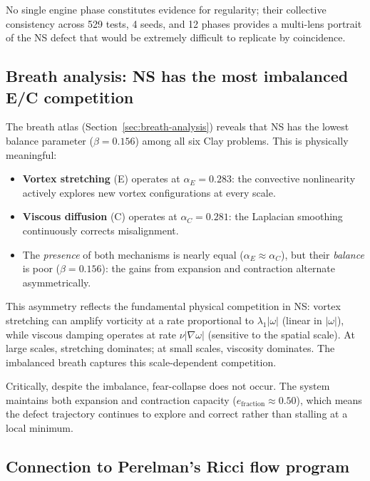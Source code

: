 \documentclass[11pt]{article}
\theoremstyle{definition}
\theoremstyle{remark}
\begin{document}
No single engine phase constitutes evidence for regularity; their collective
consistency across 529 tests, 4 seeds, and 12 phases provides a multi-lens
portrait of the NS defect that would be extremely difficult to replicate
by coincidence.

\subsection{Breath analysis: NS has the most imbalanced E/C competition}

The breath atlas (Section~\ref{sec:breath-analysis}) reveals that NS has
the lowest balance parameter ($\beta = 0.156$) among all six Clay problems.
This is physically meaningful:

\begin{itemize}[nosep]
  \item \textbf{Vortex stretching} (E) operates at $\alpha_E = 0.283$:
    the convective nonlinearity actively explores new vortex configurations
    at every scale.
  \item \textbf{Viscous diffusion} (C) operates at $\alpha_C = 0.281$:
    the Laplacian smoothing continuously corrects misalignment.
  \item The \emph{presence} of both mechanisms is nearly equal ($\alpha_E
    \approx \alpha_C$), but their \emph{balance} is poor ($\beta = 0.156$):
    the gains from expansion and contraction alternate asymmetrically.
\end{itemize}

This asymmetry reflects the fundamental physical competition in NS: vortex
stretching can amplify vorticity at a rate proportional to $\lambda_1|\omega|$
(linear in $|\omega|$), while viscous damping operates at rate $\nu|\nabla\omega|$
(sensitive to the spatial scale).  At large scales, stretching dominates; at
small scales, viscosity dominates.  The imbalanced breath captures this scale-dependent
competition.

Critically, despite the imbalance, fear-collapse does not occur.  The system
maintains both expansion and contraction capacity ($e_{\mathrm{fraction}}
\approx 0.50$), which means the defect trajectory continues to explore and
correct rather than stalling at a local minimum.

\subsection{Connection to Perelman's Ricci flow program}
\end{document}
